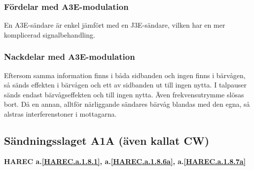 \subsubsection{Fördelar med A3E-modulation}

En A3E-sändare är enkel jämfört med en J3E-sändare, vilken har en mer
komplicerad signalbehandling.

\subsubsection{Nackdelar med A3E-modulation}

Eftersom samma information finns i båda sidbanden och ingen finns i bärvågen,
så sänds effekten i bärvågen och ett av sidbanden ut till ingen nytta. I
talpauser sänds endast bärvågseffekten och till ingen nytta. Även
frekvensutrymme slösas bort. Då en annan, alltför närliggande sändares bärvåg
blandas med den egna, så alstras interferenstoner i mottagarna.

\subsection{Sändningsslaget A1A (även kallat CW)}
\textbf{HAREC a.\ref{HAREC.a.1.8.1}, a.\ref{HAREC.a.1.8.6a}, a.\ref{HAREC.a.1.8.7a}\label{myHAREC.a.1.8.1}\label{myHAREC.a.1.8.6a}\label{myHAREC.a.1.8.7a}}

